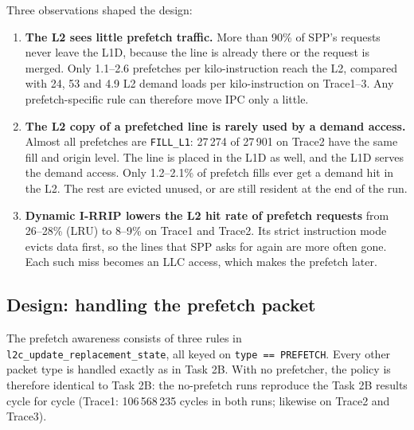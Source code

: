 \documentclass[11pt]{article}
\begin{document}
Three observations shaped the design:
\begin{enumerate}
  \item \textbf{The L2 sees little prefetch traffic.} More than 90\% of SPP's requests never leave the
        L1D, because the line is already there or the request is merged. Only 1.1--2.6 prefetches per kilo-instruction reach the L2,
        compared with 24, 53 and 4.9 L2 demand loads per kilo-instruction on Trace1--3. Any
        prefetch-specific rule can therefore move IPC only a little.
  \item \textbf{The L2 copy of a prefetched line is rarely used by a demand access.} Almost all
        prefetches are \texttt{FILL\_L1}: 27\,274 of 27\,901 on Trace2 have the same fill and
        origin level. The line is placed in the L1D as well, and the L1D serves the demand access.
        Only 1.2--2.1\% of prefetch fills ever get a demand hit in the L2. The rest are evicted
        unused, or are still resident at the end of the run.
  \item \textbf{Dynamic I-RRIP lowers the L2 hit rate of prefetch requests} from 26--28\% (LRU)
        to 8--9\% on Trace1 and Trace2. Its strict instruction mode evicts data first, so the
        lines that SPP asks for again are more often gone. Each such miss becomes an LLC access,
        which makes the prefetch later.
\end{enumerate}

\subsection{Design: handling the prefetch packet}

The prefetch awareness consists of three rules in \texttt{l2c\_update\_replacement\_state}, all
keyed on \texttt{type == PREFETCH}. Every other packet type is handled exactly as in Task 2B.
With no prefetcher, the policy is therefore identical to Task 2B: the no-prefetch runs reproduce
the Task 2B results cycle for cycle (Trace1: 106\,568\,235 cycles in both runs; likewise on Trace2 and Trace3).
\end{document}
